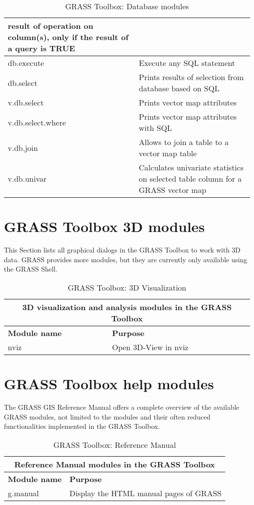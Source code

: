 \begin{table}[H]
\begin{tabular}{|p{4cm}|p{10cm}|}
  result of operation on column(s), only if the result of a query is TRUE \\
  \hline db.execute & Execute any SQL statement \\
  \hline db.select & Prints results of selection from database based on SQL \\
  \hline v.db.select & Prints vector map attributes \\
  \hline v.db.select.where & Prints vector map attributes with SQL \\
  \hline v.db.join & Allows to join a table to a vector map table \\
  \hline v.db.univar & Calculates univariate statistics on selected table
  column for a GRASS vector map \\
\hline
\end{tabular}
\caption{GRASS Toolbox: Database modules}
\end{table}

\clearpage

\section{GRASS Toolbox 3D modules}

This Section lists all graphical dialogs in the GRASS Toolbox to work with 3D 
data. GRASS provides more modules, but they are currently only available using 
the GRASS Shell.

\begin{table}[H]
\centering
 \begin{tabular}{|p{4cm}|p{10cm}|}
  \hline \multicolumn{2}{|c|}{\textbf{3D visualization and analysis modules in the GRASS
  Toolbox}} \\
  \hline \textbf{Module name} & \textbf{Purpose} \\
  \hline nviz & Open 3D-View in nviz\\
\hline
\end{tabular}
\caption{GRASS Toolbox: 3D Visualization}
\end{table}

\section{GRASS Toolbox help modules}

The GRASS GIS Reference Manual offers a complete overview of the available 
GRASS modules, not limited to the modules and their often reduced functionalities 
implemented in the GRASS Toolbox. 

\begin{table}[H]
\centering
 \begin{tabular}{|p{4cm}|p{10cm}|}
  \hline \multicolumn{2}{|c|}{\textbf{Reference Manual modules in the GRASS
  Toolbox}} \\
  \hline \textbf{Module name} & \textbf{Purpose} \\
  \hline g.manual & Display the HTML manual pages of GRASS \\
\hline
\end{tabular}
\caption{GRASS Toolbox: Reference Manual}
\end{table}
